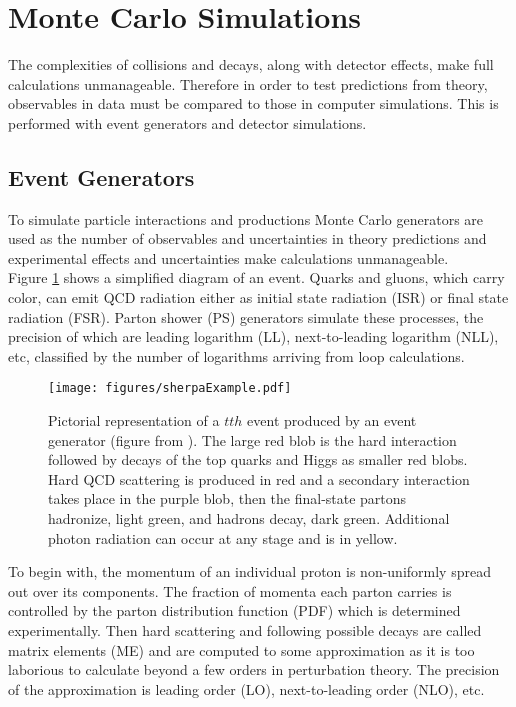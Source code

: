 \section{Monte Carlo Simulations}

The complexities of collisions and decays, along with detector effects, make full calculations unmanageable.  Therefore in order to test predictions from theory, observables in data must be compared to those in computer simulations.  This is performed with event generators and detector simulations.

\subsection{Event Generators}

To simulate particle interactions and productions Monte Carlo generators are used as the number of observables and uncertainties in theory predictions and experimental effects and uncertainties make calculations unmanageable.  \\

Figure \ref{fig:eventSherpa} shows a simplified diagram of an event.  Quarks and gluons, which carry color, can emit QCD radiation either as initial state radiation (ISR) or final state radiation (FSR).  Parton shower (PS) generators simulate these processes, the precision of which are leading logarithm (LL), next-to-leading logarithm (NLL), etc, classified by the number of logarithms arriving from loop calculations.  \\

\begin{figure}[!htb]
	\centering
	\texttt{[image: figures/sherpaExample.pdf]}
	\caption[Simplified diagram of an event]{Pictorial representation of a $tth$ event produced by an event generator (figure from \cite{sherpa}).  The large red blob is the hard interaction followed by decays of the top quarks and Higgs as smaller red blobs.  Hard QCD scattering is produced in red and a secondary interaction takes place in the purple blob, then the final-state partons hadronize, light green, and hadrons decay, dark green.  Additional photon radiation can occur at any stage and is in yellow.}
	\label{fig:eventSherpa}
\end{figure}

To begin with, the momentum of an individual proton is non-uniformly spread out over its components.  The fraction of momenta each parton carries is controlled by the parton distribution function (PDF) which is determined experimentally.  Then hard scattering and following possible decays are called matrix elements (ME) and are computed to some approximation as it is too laborious to calculate beyond a few orders in perturbation theory.  The precision of the approximation is leading order (LO), next-to-leading order (NLO), etc. 

